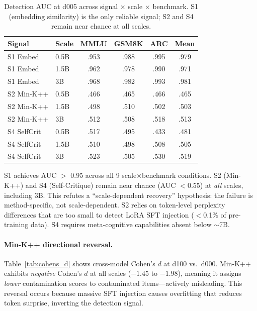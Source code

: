 \documentclass[11pt,a4paper]{article}
\begin{document}
\begin{table}[t]
\centering
\small
\caption{Detection AUC at d005 across signal $\times$ scale $\times$ benchmark. S1 (embedding similarity) is the only reliable signal; S2 and S4 remain near chance at all scales.}
\label{tab:signal_auc}
\begin{tabular}{llcccc}
\toprule
Signal & Scale & MMLU & GSM8K & ARC & Mean \\
\midrule
S1 Embed & 0.5B & .953 & .988 & .995 & .979 \\
S1 Embed & 1.5B & .962 & .978 & .990 & .971 \\
S1 Embed & 3B & .968 & .982 & .993 & .981 \\
\midrule
S2 Min-K++ & 0.5B & .466 & .465 & .466 & .465 \\
S2 Min-K++ & 1.5B & .498 & .510 & .502 & .503 \\
S2 Min-K++ & 3B & .512 & .508 & .518 & .513 \\
\midrule
S4 SelfCrit & 0.5B & .517 & .495 & .433 & .481 \\
S4 SelfCrit & 1.5B & .510 & .498 & .508 & .505 \\
S4 SelfCrit & 3B & .523 & .505 & .530 & .519 \\
\bottomrule
\end{tabular}
\end{table}

S1 achieves AUC $>$ 0.95 across all 9 scale$\times$benchmark conditions. S2 (Min-K++) and S4 (Self-Critique) remain near chance (AUC $< 0.55$) at \emph{all} scales, including 3B. This refutes a ``scale-dependent recovery'' hypothesis: the failure is method-specific, not scale-dependent. S2 relies on token-level perplexity differences that are too small to detect LoRA SFT injection ($<$0.1\% of pre-training data). S4 requires meta-cognitive capabilities absent below $\sim$7B.

\paragraph{Min-K++ directional reversal.} Table~\ref{tab:cohens_d} shows cross-model Cohen's $d$ at d100 vs.\ d000. Min-K++ exhibits \emph{negative} Cohen's $d$ at all scales ($-1.45$ to $-1.98$), meaning it assigns \emph{lower} contamination scores to contaminated items---actively misleading. This reversal occurs because massive SFT injection causes overfitting that reduces token surprise, inverting the detection signal.
\end{document}
